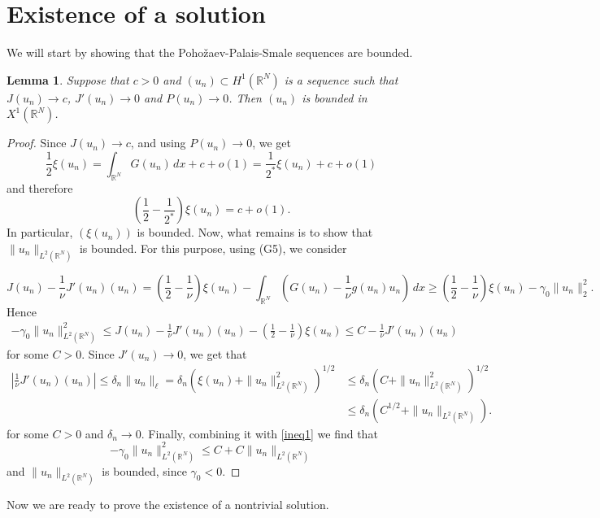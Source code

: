 \documentclass[12pt,leqno,twoside,sort]{amsart}
\newtheorem{Lem}[Th]{Lemma}
\newcommand{\R}{\mathbb{R}}
\numberwithin{equation}{section}
\begin{document}
\section{Existence of a solution}\label{sect:5}

We will start by showing that the Poho\v{z}aev-Palais-Smale sequences are bounded. 

\begin{Lem}\label{Lem:PPS-bounded}
Suppose that $c > 0$ and $(u_n) \subset H^1 (\R^N)$ is a sequence such that $J(u_n) \to c$, $J'(u_n) \to 0$ and $P(u_n) \to 0$. Then $(u_n)$ is bounded in $X^1 (\R^N)$.
\end{Lem}

\begin{proof}
Since $J(u_n) \to c$, and using $P(u_n) \to 0$, we get
$$
\frac12 \xi (u_n) =  \int_{\R^N} G(u_n) \, dx + c + o(1) = \frac{1}{2^*} \xi(u_n) + c + o(1)
$$
and therefore
$$
\left(\frac12 - \frac{1}{2^*}\right) \xi(u_n) = c + o(1). 
$$
In particular, $(\xi(u_n))$ is bounded. Now, what remains is to show that $\|u_n\|_{L^2 (\R^N)}$ is bounded. For this purpose, using (G5), we consider

$$
J(u_n) - \frac{1}{\nu} J'(u_n)(u_n) = \left( \frac{1}{2} - \frac{1}{\nu} \right) \xi(u_n) - \int_{\R^N} \left( G(u_n) - \frac{1}{\nu} g(u_n) u_n \right) \, dx \geq \left( \frac{1}{2} - \frac{1}{\nu} \right) \xi(u_n) - \gamma_0 \|u_n\|_2^2.
$$
Hence
\begin{align}\label{ineq1}
- \gamma_0 \|u_n\|_{L^2(\R^N)}^2 \leq J(u_n) - \frac{1}{\nu} J'(u_n)(u_n) - \left( \frac{1}{2} - \frac{1}{\nu} \right) \xi(u_n) \leq C - \frac{1}{\nu} J'(u_n)(u_n)
\end{align}
for some $C > 0$. Since $J'(u_n) \to 0$, we get that 
\begin{align*}
\left| \frac{1}{\nu} J'(u_n)(u_n) \right| \leq \delta_n \|u_n\|_\ell = \delta_n \left( \xi(u_n) + \|u_n\|_{L^2(\R^N)}^2 \right)^{1/2} &\leq \delta_n \left( C + \|u_n\|_{L^2(\R^N)}^2 \right)^{1/2} \\
&\leq \delta_n \left(C^{1/2} + \|u_n\|_{L^2(\R^N)}\right).
\end{align*}
for some $C>0$ and $\delta_n \to 0$. Finally, combining it with \eqref{ineq1} we find that
$$
-\gamma_0 \|u_n\|_{L^2(\R^N)}^2 \leq C + C \|u_n\|_{L^2 (\R^N)}
$$
and $\|u_n\|_{L^2(\R^N)}$ is bounded, since $\gamma_0 < 0$.
\end{proof}

Now we are ready to prove the existence of a nontrivial solution.
\end{document}
